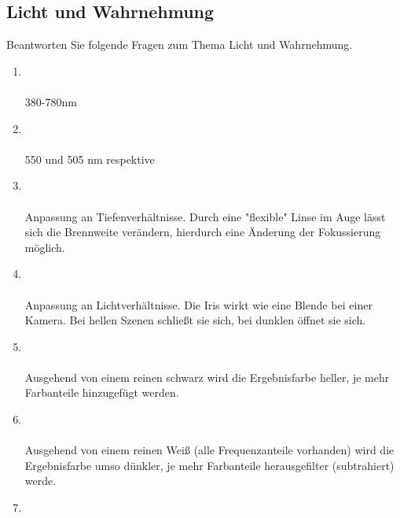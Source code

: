 \subsection{Licht und Wahrnehmung}
Beantworten Sie folgende Fragen zum Thema Licht und Wahrnehmung.
\begin{enumerate}
    \item   {}\\\\
            380-780nm
    \item   {} \\\\
            550 und 505 nm respektive
    \item   {}\\\\
            Anpassung an Tiefenverhältnisse. Durch eine "flexible" Linse im Auge lässt sich die Brennweite verändern, hierdurch eine Änderung 
            der Fokussierung möglich.
    \item   {} \\\\
            Anpassung an Lichtverhältnisse. Die Iris wirkt wie eine Blende bei einer Kamera. Bei hellen Szenen schließt sie sich, bei dunklen öffnet sie sich.
    \item   {}\\\\
            Ausgehend von einem reinen schwarz wird die Ergebnisfarbe heller, je mehr Farbanteile hinzugefügt werden.
    \item   {}\\\\
            Ausgehend von einem reinen Weiß (alle Frequenzanteile vorhanden) wird die Ergebnisfarbe umso dünkler, je mehr Farbanteile herausgefilter (subtrahiert) werde. 
    \item   {} \\\\

\end{enumerate}
